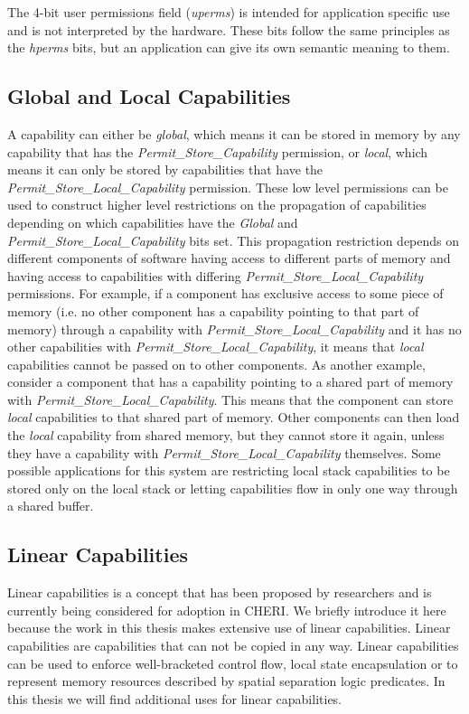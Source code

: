 The 4-bit user permissions field (\textit{uperms}) is intended for application specific use and is not interpreted by the hardware. These bits follow the same principles as the \textit{hperms} bits, but an application can give its own semantic meaning to them.

\subsection{Global and Local Capabilities}
\label{sec:global}
A capability can either be \textit{global}, which means it can be stored in memory by any capability that has the \textit{Permit\_Store\_Capability} permission, or \textit{local}, which means it can only be stored by capabilities that have the \textit{Permit\_Store\_Local\_Capability} permission. These low level permissions can be used to construct higher level restrictions on the propagation of capabilities depending on which capabilities have the \textit{Global} and \textit{Permit\_Store\_Local\_Capability} bits set. This propagation restriction depends on different components of software having access to different parts of memory and having access to capabilities with differing \textit{Permit\_Store\_Local\_Capability} permissions. For example, if a component has exclusive access to some piece of memory (i.e. no other component has a capability pointing to that part of memory) through a capability with \textit{Permit\_Store\_Local\_Capability} and it has no other capabilities with \textit{Permit\_Store\_Local\_Capability}, it means that \textit{local} capabilities cannot be passed on to other components. As another example, consider a component that has a capability pointing to a shared part of memory with \textit{Permit\_Store\_Local\_Capability}. This means that the component can store \textit{local} capabilities to that shared part of memory. Other components can then load the \textit{local} capability from shared memory, but they cannot store it again, unless they have a capability with \textit{Permit\_Store\_Local\_Capability} themselves.
Some possible applications for this system are restricting local stack capabilities to be stored only on the local stack or letting capabilities flow in only one way through a shared buffer.\cite{UCAM-CL-TR-951} %

\subsection{Linear Capabilities}
Linear capabilities is a concept that has been proposed by researchers and is currently being considered for adoption in CHERI. We briefly introduce it here because the work in this thesis makes extensive use of linear capabilities. Linear capabilities are capabilities that can not be copied in any way. Linear capabilities can be used to enforce well-bracketed control flow, local state encapsulation \cite{10.1145/3290332} or to represent memory resources described by spatial separation logic predicates.\cite{10.1145/3341688} In this thesis we will find additional uses for linear capabilities.

